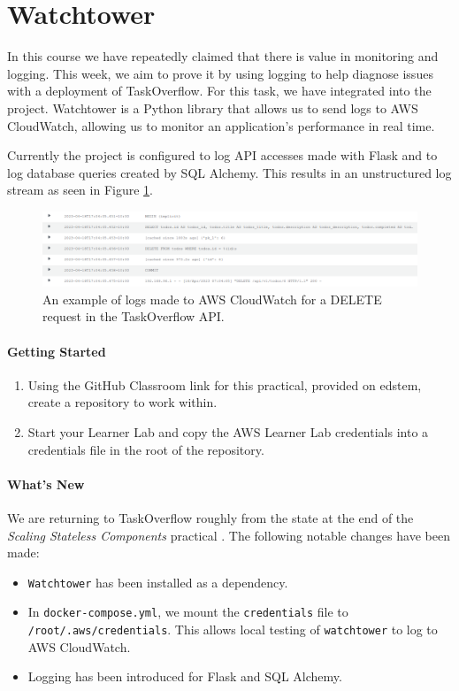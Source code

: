 \documentclass{csse4400}
\begin{document}
\section{Watchtower}
In this course we have repeatedly claimed that there is value in monitoring and logging.
This week, we aim to prove it by using logging to help diagnose issues with a deployment of TaskOverflow.
For this task, we have integrated  into the project.
Watchtower is a Python library that allows us to send logs to AWS CloudWatch,
allowing us to monitor an application's performance in real time.

Currently the project is configured to log API accesses made with Flask and to log database queries created by SQL Alchemy.
This results in an unstructured log stream as seen in Figure \ref{fig:cloud-logs}.

\begin{figure}[ht]
    \centering
    \begin{adjustwidth}{-7.5mm}{-7.5mm}
        \includegraphics[width=0.95\paperwidth]{images/cloud-watch-log}
    \end{adjustwidth}
    \caption{An example of logs made to AWS CloudWatch for a DELETE request in the TaskOverflow API.}
    \label{fig:cloud-logs}
\end{figure}

\paragraph{Getting Started}
\begin{enumerate}
    \item Using the GitHub Classroom link for this practical, provided on edstem, create a repository to work within.
    \item Start your Learner Lab and copy the AWS Learner Lab credentials into a credentials file in the root of the repository.
\end{enumerate}

\paragraph{What's New}
We are returning to TaskOverflow roughly from the state at the end of the
\textit{Scaling Stateless Components} practical \cite{prac-week6}.
The following notable changes have been made:
\begin{itemize}
    \item \texttt{Watchtower} has been installed as a dependency.
    \item In \texttt{docker-compose.yml}, we mount the \texttt{credentials} file to \texttt{/root/.aws/credentials}.
        This allows local testing of \texttt{watchtower} to log to AWS CloudWatch.
    \item Logging has been introduced for Flask and SQL Alchemy.
\end{itemize}
\end{document}
